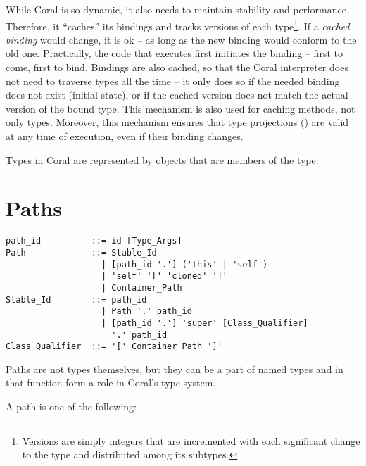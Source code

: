 While Coral is so dynamic, it also needs to maintain stability and performance. Therefore, it ``caches'' its bindings and tracks versions of each type\footnote{Versions are simply integers that are incremented with each significant change to the type and distributed among its subtypes.}. If a \textit{cached binding} would change, it is ok -- as long as the new binding would conform to the old one. Practically, the code that executes first initiates the binding -- first to come, first to bind. Bindings are also cached, so that the Coral interpreter does not need to traverse types all the time -- it only does so if the needed binding does not exist (initial state), or if the cached version does not match the actual version of the bound type. This mechanism is also used for caching methods, not only types. Moreover, this mechanism ensures that type projections () are valid at any time of execution, even if their binding changes. 

Types in Coral are represented by objects that are members of the  type. 






\section{Paths}
\label{sec:type-paths}

\syntax\begin{lstlisting}
path_id          ::= id [Type_Args]
Path             ::= Stable_Id
                   | [path_id '.'] ('this' | 'self')
                   | 'self' '[' 'cloned' ']'
                   | Container_Path
Stable_Id        ::= path_id
                   | Path '.' path_id
                   | [path_id '.'] 'super' [Class_Qualifier] 
                     '.' path_id
Class_Qualifier  ::= '[' Container_Path ']'
\end{lstlisting}

Paths are not types themselves, but they can be a part of named types and in that function form a role in Coral's type system. 

A path is one of the following:

